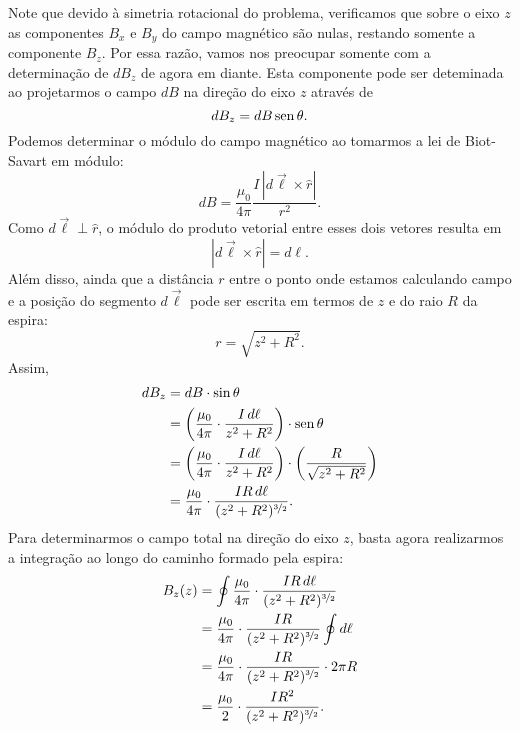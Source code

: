 Note que devido à simetria rotacional do problema, verificamos que sobre o eixo $z$ as componentes $B_x$ e $B_y$ do campo magnético são nulas, restando somente a componente $B_z$. Por essa razão, vamos nos preocupar somente com a determinação de $dB_z$ de agora em diante. Esta componente pode ser deteminada ao projetarmos o campo $dB$ na direção do eixo $z$ através de 
\begin{equation}
    dB_z = dB \operatorname{sen}\theta.
\end{equation}
%
Podemos determinar o módulo do campo magnético ao tomarmos a lei de Biot-Savart em módulo:
\begin{equation}
    dB = \frac{\mu_0}{4\pi} \frac{I\, |d\vec{\ell} \times \hat{r}|}{r^2}.
\end{equation}
%
Como $d\vec{\ell} \perp \hat{r}$, o módulo do produto vetorial entre esses dois vetores resulta em
\begin{equation}
    |d\vec{\ell} \times \hat{r}| = d\ell.
\end{equation}
%
Além disso, ainda que a distância $r$ entre o ponto onde estamos calculando campo e a posição do segmento $d\vec{\ell}$ pode ser escrita em termos de $z$ e do raio $R$ da espira:
\begin{equation}
    r = \sqrt{z^2 + R^2}.
\end{equation}
%
Assim,
\begin{align}
    dB_z &= dB \cdot \sin\theta \\
    &= \left(\frac{\mu_0}{4\pi} \cdot \frac{I \,d\ell}{z^2 + R^2}\right) \cdot \operatorname{sen}\theta \\
    &= \left(\frac{\mu_0}{4\pi} \cdot \frac{I \,d\ell}{z^2 + R^2}\right) \cdot \left(\frac{R}{\sqrt{z^2+R^2}}\right) \\
    &= \frac{\mu_0}{4\pi} \cdot \frac{IR \,d\ell}{(z^2 + R^2)^{\nicefrac{3}{2}}}.
\end{align}
%
Para determinarmos o campo total na direção do eixo $z$, basta agora realizarmos a integração ao longo do caminho formado pela espira:
\begin{align}
    B_z(z) &= \oint \frac{\mu_0}{4\pi} \cdot \frac{IR \,d\ell}{(z^2 + R^2)^{\nicefrac{3}{2}}} \\
    &= \frac{\mu_0}{4\pi} \cdot \frac{IR}{(z^2 + R^2)^{\nicefrac{3}{2}}} \oint d\ell \\
    &= \frac{\mu_0}{4\pi} \cdot \frac{IR}{(z^2 + R^2)^{\nicefrac{3}{2}}} \cdot 2\pi R \\
    &= \frac{\mu_0}{2} \cdot \frac{IR^2}{(z^2 + R^2)^{\nicefrac{3}{2}}}. \label{Eq:CampoMagneticoEspiraCircular}
\end{align}

